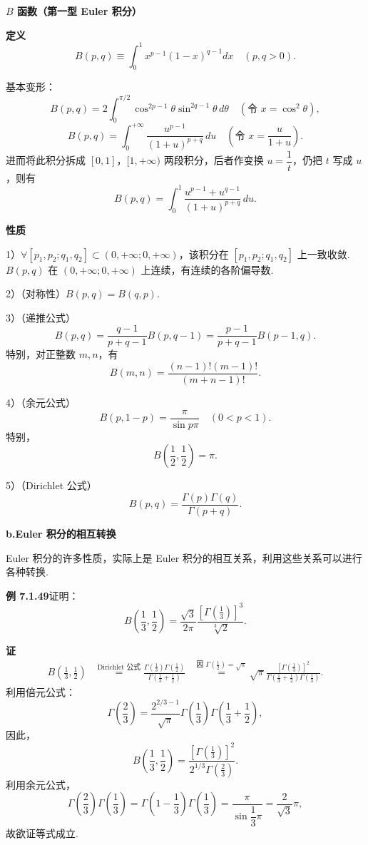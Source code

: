 \documentclass[UTF8, 12pt, fontset=fandol, oneside]{ctexart}
\begin{document}
\noindent\textbf{$B$ 函数（第一型 Euler 积分）}

\noindent\textbf{定义}\quad
\[
B(p,q)\equiv\int_0^1x^{p-1}(1-x)^{q-1}dx\quad(p,q>0).
\]

\noindent 基本变形：
\[
B(p,q)=2\int_0^{\pi/2}\cos^{2p-1}\theta\sin^{2q-1}\theta\,d\theta
\quad(\text{令 }x=\cos^2\theta),
\]
\[
B(p,q)=\int_0^{+\infty}\frac{u^{p-1}}{(1+u)^{p+q}}\,du
\quad\left(\text{令 }x=\frac{u}{1+u}\right).
\]
进而将此积分拆成 $[0,1]$，$[1,+\infty)$ 两段积分，后者作变换 $u=\dfrac1t$，仍把 $t$ 写成 $u$，则有
\[
B(p,q)=\int_0^1\frac{u^{p-1}+u^{q-1}}{(1+u)^{p+q}}\,du.
\]

\noindent\textbf{性质}\quad

1）$\forall [p_1,p_2;q_1,q_2]\subset(0,+\infty;0,+\infty)$，该积分在 $[p_1,p_2;q_1,q_2]$ 上一致收敛. $B(p,q)$ 在 $(0,+\infty;0,+\infty)$ 上连续，有连续的各阶偏导数.

2）（对称性）$B(p,q)=B(q,p)$.

3）（递推公式）
\[
B(p,q)=\frac{q-1}{p+q-1}B(p,q-1)=\frac{p-1}{p+q-1}B(p-1,q).
\]
特别，对正整数 $m,n$，有
\[
B(m,n)=\frac{(n-1)!(m-1)!}{(m+n-1)!}.
\]

4）（余元公式）
\[
B(p,1-p)=\frac{\pi}{\sin p\pi}\quad(0<p<1).
\]
特别，
\[
B\left(\frac12,\frac12\right)=\pi.
\]

5）（Dirichlet 公式）
\[
B(p,q)=\frac{\Gamma(p)\Gamma(q)}{\Gamma(p+q)}.
\]

\noindent\textbf{b.\quad Euler 积分的相互转换}

Euler 积分的许多性质，实际上是 Euler 积分的相互关系，利用这些关系可以进行各种转换.

\noindent\textbf{例 7.1.49}\quad 证明：
\[
B\left(\frac13,\frac12\right)=
\frac{\sqrt3}{2\pi}\frac{\left[\Gamma\left(\frac13\right)\right]^3}{\sqrt[3]{2}}.
\]

\noindent\textbf{证}\quad
\[
\begin{aligned}
B\left(\frac13,\frac12\right)
&\overset{\text{Dirichlet 公式}}{=}
\frac{\Gamma\left(\frac13\right)\Gamma\left(\frac12\right)}
{\Gamma\left(\frac13+\frac12\right)}
&\overset{\text{因 }\Gamma\left(\frac12\right)=\sqrt\pi}{=}
\sqrt\pi\frac{\left[\Gamma\left(\frac13\right)\right]^2}
{\Gamma\left(\frac13+\frac12\right)\Gamma\left(\frac13\right)}.
\end{aligned}
\]
利用倍元公式：
\[
\Gamma\left(\frac23\right)
=\frac{2^{2/3-1}}{\sqrt\pi}\Gamma\left(\frac13\right)\Gamma\left(\frac13+\frac12\right),
\]
因此，
\[
B\left(\frac13,\frac12\right)=
\frac{\left[\Gamma\left(\frac13\right)\right]^2}{2^{1/3}\Gamma\left(\frac23\right)}.
\]
利用余元公式，
\[
\Gamma\left(\frac23\right)\Gamma\left(\frac13\right)
=\Gamma\left(1-\frac13\right)\Gamma\left(\frac13\right)
=\frac{\pi}{\sin\dfrac13\pi}=\frac{2}{\sqrt3}\pi,
\]
故欲证等式成立.
\end{document}
